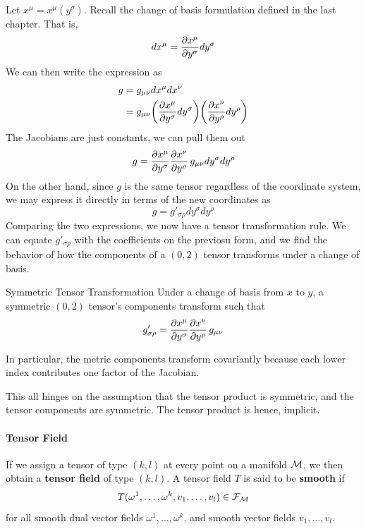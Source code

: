 	Let $x^\mu = x^\mu(y^\sigma)$. Recall the change of basis formulation defined in the last chapter. That is,
	\[
		dx^\mu = \pdv{x^\mu}{y^\sigma} dy^\sigma
	\]
	We can then write the expression as
	\begin{align*}
		g 
		&= g_{\mu\nu} dx^\mu dx^\nu\\
		&= g_{\mu\nu} 
		\pqty{
			\pdv{x^\mu}{y^\sigma} 
			dy^\sigma 
		}
		\pqty{
			\pdv{x^\nu}{y^\rho} 
			dy^\rho 
		}
	\end{align*}
	The Jacobians are just constants, we can pull them out
	\[
		g = 
			\pdv{x^\mu}{y^\sigma} 
			\pdv{x^\nu}{y^\rho} 
			\,
		g_{\mu\nu} 
			dy^\sigma
			dy^\rho 
	\]
	On the other hand, since $g$ is the same tensor regardless of the 
	coordinate system, we may express it directly in terms of the new coordinates
	as
	\[
		g = g'_{\sigma\rho} dy^\sigma dy^\rho
	\]
	Comparing the two expressions, we now have a tensor transformation rule. We can equate 
	$g'_{\sigma\rho}$ with the coefficients on the previosu form, and we find the behavior of
	how the components of a $(0,2)$ tensor transforms under a change of basis.

	\begin{theorem}{Symmetric Tensor Transformation}
		Under a change of basis from $x$ to $y$, a symmetric $(0,2)$ tensor's components
		transform such that
		\begin{equation}
			\label{eq:symmetric-tensor-transformation}
			g'_{\sigma\rho} 
			=
			\pdv{x^\mu}{y^\sigma} 
			\pdv{x^\nu}{y^\rho} 
			\,
			g_{\mu\nu} 
		\end{equation}    
	\end{theorem}
	
	In particular,
	the metric components transform covariantly because each lower index
	contributes one factor of the Jacobian.

	This all hinges on the assumption that the tensor product is symmetric, and the tensor components are symmetric.
	The tensor product is hence, implicit.
	\paragraph{Tensor Field}
	If we assign a tensor of type $(k,l)$ at every point on a manifold $\mathcal M$, we then obtain  a
	\textbf{tensor field} of type $(k,l)$. A tensor field $T$ is said to be \textbf{smooth} if 
	\[
		T(\omega^1,\ldots,\omega^k, v_1,\ldots, v_l)\in \mathcal{F}_{\mathcal M}
	\]
	for all smooth dual vector fields $\omega^1,\ldots,\omega^k$, and smooth vector
	fields $v_1,\ldots, v_l$.

